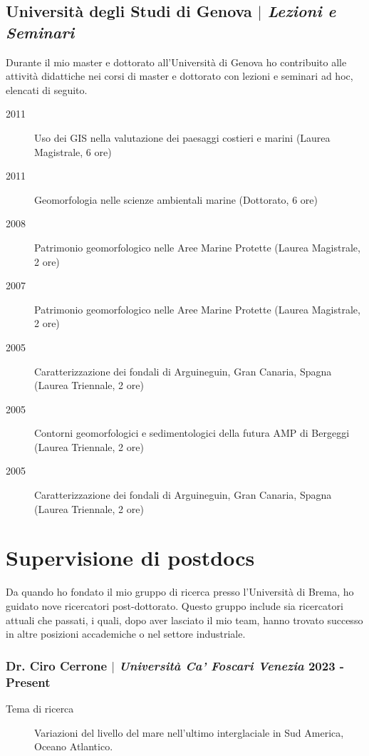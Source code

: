 \documentclass[11pt]{article}
\begin{document}
\subsection{Università degli Studi di Genova $|$ {\normalfont\textit{Lezioni e Seminari}}}
{\footnotesize Durante il mio master e dottorato all'Università di Genova ho contribuito alle attività didattiche nei corsi di master e dottorato con lezioni e seminari ad hoc, elencati di seguito.}
{\footnotesize 
\begin{description}
  \item [2011] Uso dei GIS nella valutazione dei paesaggi costieri e marini (Laurea Magistrale, 6 ore)
  \item [2011] Geomorfologia nelle scienze ambientali marine (Dottorato, 6 ore)
  \item [2008] Patrimonio geomorfologico nelle Aree Marine Protette (Laurea Magistrale, 2 ore)
  \item [2007] Patrimonio geomorfologico nelle Aree Marine Protette (Laurea Magistrale, 2 ore)
  \item [2005] Caratterizzazione dei fondali di Arguineguin, Gran Canaria, Spagna (Laurea Triennale, 2 ore)
  \item [2005] Contorni geomorfologici e sedimentologici della futura AMP di Bergeggi (Laurea Triennale, 2 ore)
  \item [2005] Caratterizzazione dei fondali di Arguineguin, Gran Canaria, Spagna (Laurea Triennale, 2 ore)
\end{description}
}

\section{Supervisione di postdocs}
{\normalfont Da quando ho fondato il mio gruppo di ricerca presso l'Università di Brema, ho guidato nove ricercatori post-dottorato. Questo gruppo include sia ricercatori attuali che passati, i quali, dopo aver lasciato il mio team, hanno trovato successo in altre posizioni accademiche o nel settore industriale.}\\

\subsubsection{Dr. Ciro Cerrone $|$ {\normalfont\textit{Università Ca' Foscari Venezia}} \hfill 2023 - Present}
{\footnotesize 
\begin{description}
  \item [Tema di ricerca] Variazioni del livello del mare nell'ultimo interglaciale in Sud America, Oceano Atlantico. 
\end{description}
}
\smallskip
\end{document}
